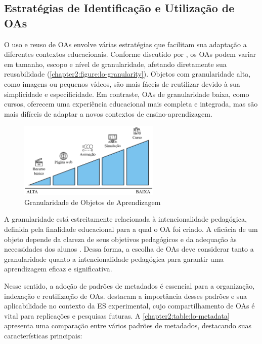 \subsection{Estratégias de Identificação e Utilização de OAs}

O uso e reuso de OAs envolve várias estratégias que facilitam sua adaptação a diferentes contextos educacionais. Conforme discutido por , os OAs podem variar em tamanho, escopo e nível de granularidade, afetando diretamente sua reusabilidade (\autoref{chapter2:figure:lo-granularity}). Objetos com granularidade alta, como imagens ou pequenos vídeos, são mais fáceis de reutilizar devido à sua simplicidade e especificidade. Em contraste, OAs de granularidade baixa, como cursos, oferecem uma experiência educacional mais completa e integrada, mas são mais difíceis de adaptar a novos contextos de ensino-aprendizagem.

\begin{figure}[htb]
\centering
\caption{Granularidade de Objetos de Aprendizagem}
\label{chapter2:figure:lo-granularity}
\includegraphics[width=0.6\textwidth]{images/chapter2-lo-granularity.jpg}
\end{figure}

A granularidade está estreitamente relacionada à intencionalidade pedagógica, definida pela finalidade educacional para a qual o OA foi criado. A eficácia de um objeto depende da clareza de seus objetivos pedagógicos e da adequação às necessidades dos alunos \cite{Bloom1984}. Dessa forma, a escolha de OAs deve considerar tanto a granularidade quanto a intencionalidade pedagógica para garantir uma aprendizagem eficaz e significativa.

Nesse sentido, a adoção de padrões de metadados é essencial para a organização, indexação e reutilização de OAs.  destacam a importância desses padrões e sua aplicabilidade no contexto da ES experimental, cujo compartilhamento de OAs é vital para replicações e pesquisas futuras. A \autoref{chapter2:table:lo-metadata} apresenta uma comparação entre vários padrões de metadados, destacando suas características principais:

